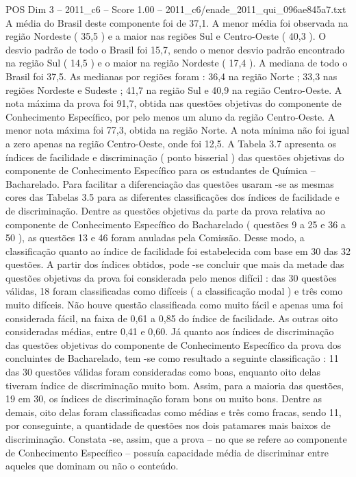 \begin{textsample}{POS Dim 3 – 2011\_c6 – Score 1.00 – 2011\_c6/enade\_2011\_qui\_096ae845a7.txt}
A média do Brasil deste componente foi de 37,1.
A menor média foi observada na região Nordeste ( 35,5 ) e a maior nas regiões Sul e Centro-Oeste ( 40,3 ).
O desvio padrão de todo o Brasil foi 15,7, sendo o menor desvio padrão encontrado na região Sul ( 14,5 ) e o maior na região Nordeste ( 17,4 ).
A mediana de todo o Brasil foi 37,5.
As medianas por regiões foram : 36,4 na região Norte ; 33,3 nas regiões Nordeste e Sudeste ; 41,7 na região Sul e 40,9 na região Centro-Oeste.
A nota máxima da prova foi 91,7, obtida nas questões objetivas do componente de Conhecimento Específico, por pelo menos um aluno da região Centro-Oeste.
A menor nota máxima foi 77,3, obtida na região Norte.
A nota mínima não foi igual a zero apenas na região Centro-Oeste, onde foi 12,5.
A Tabela 3.7 apresenta os índices de facilidade e discriminação ( ponto bisserial ) das questões objetivas do componente de Conhecimento Específico para os estudantes de Química – Bacharelado.
Para facilitar a diferenciação das questões usaram -se as mesmas cores das Tabelas 3.5 para as diferentes classificações dos índices de facilidade e de discriminação.
Dentre as questões objetivas da parte da prova relativa ao componente de Conhecimento Específico do Bacharelado ( questões 9 a 25 e 36 a 50 ), as questões 13 e 46 foram anuladas pela Comissão.
Desse modo, a classificação quanto ao índice de facilidade foi estabelecida com base em 30 das 32 questões.
A partir dos índices obtidos, pode -se concluir que mais da metade das questões objetivas da prova foi considerada pelo menos difícil : das 30 questões válidas, 18 foram classificadas como difíceis ( a classificação modal ) e três como muito difíceis.
Não houve questão classificada como muito fácil e apenas uma foi considerada fácil, na faixa de 0,61 a 0,85 do índice de facilidade.
As outras oito consideradas médias, entre 0,41 e 0,60.
Já quanto aos índices de discriminação das questões objetivas do componente de Conhecimento Específico da prova dos concluintes de Bacharelado, tem -se como resultado a seguinte classificação : 11 das 30 questões válidas foram consideradas como boas, enquanto oito delas tiveram índice de discriminação muito bom.
Assim, para a maioria das questões, 19 em 30, os índices de discriminação foram bons ou muito bons.
Dentre as demais, oito delas foram classificadas como médias e três como fracas, sendo 11, por conseguinte, a quantidade de questões nos dois patamares mais baixos de discriminação.
Constata -se, assim, que a prova – no que se refere ao componente de Conhecimento Específico – possuía capacidade média de discriminar entre aqueles que dominam ou não o conteúdo.

\end{textsample}
